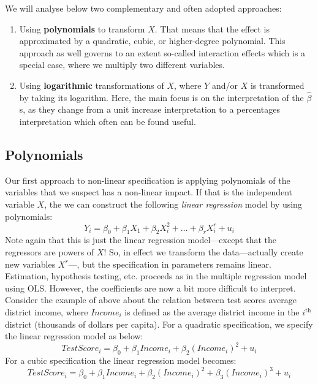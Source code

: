 \documentclass[
]{book}
\providecommand{\tightlist}{%
  \setlength{\itemsep}{0pt}\setlength{\parskip}{0pt}}
\begin{document}
We will analyse below two complementary and often adopted approaches:

\begin{enumerate}
\def\labelenumi{\arabic{enumi}.}
\tightlist
\item
  Using \textbf{polynomials} to transform \(X\). That means that the effect is approximated by a quadratic, cubic, or higher-degree polynomial. This approach as well governs to an extent so-called interaction effects which is a special case, where we multiply two different variables.
\item
  Using \textbf{logarithmic} transformations of \(X\), where \(Y\) and/or \(X\) is transformed by taking its logarithm. Here, the main focus is on the interpretation of the \(\hat{\beta}\)s, as they change from a unit increase interpretation to a percentages interpretation which often can be found useful.
\end{enumerate}

\hypertarget{polynomials}{%
\subsection{Polynomials}\label{polynomials}}

Our first approach to non-linear specification is applying polynomials of the variables that we suspect has a non-linear impact. If that is the independent variable \(X\), the we can construct the following \emph{linear regression} model by using polynomials:
\begin{equation}
Y_i = \beta_0 + \beta_1 X_1 + \beta_2 X^2_i + \ldots + \beta_r X_i^r + u_i
\label{eq:poly}
\end{equation}
Note again that this is just the linear regression model---except that the regressors are powers of \(X\)! So, in effect we transform the data---actually create new variables \(X^r\)---, but the specification in parameters remains linear. Estimation, hypothesis testing, etc. proceeds as in the multiple regression model using OLS. However, the coefficients are now a bit more difficult to interpret. Consider the example of above about the relation between test scores average district income, where \(Income_i\) is defined as the average district income in the \(i^{\mathrm{th}}\) district (thousands of dollars per capita). For a quadratic specification, we specify the linear regression model as below:
\begin{equation}
TestScore_i = \beta_0 + \beta_1 Income_i + \beta_2 (Income_i)^2 + u_i
\end{equation}
For a cubic specification the linear regression model becomes:
\begin{equation}
TestScore_i = \beta_0 + \beta_1 Income_i + \beta_2 (Income_i)^2 +
\beta_3 (Income_i)^3 + u_i
\end{equation}
\end{document}
